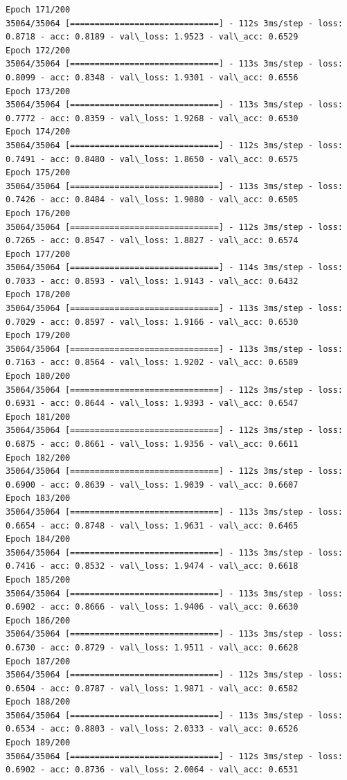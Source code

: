 \documentclass[11pt]{article}
\begin{document}
\begin{Verbatim}[commandchars=\\\{\}]
Epoch 171/200
35064/35064 [==============================] - 112s 3ms/step - loss: 0.8718 - acc: 0.8189 - val\_loss: 1.9523 - val\_acc: 0.6529
Epoch 172/200
35064/35064 [==============================] - 113s 3ms/step - loss: 0.8099 - acc: 0.8348 - val\_loss: 1.9301 - val\_acc: 0.6556
Epoch 173/200
35064/35064 [==============================] - 113s 3ms/step - loss: 0.7772 - acc: 0.8359 - val\_loss: 1.9268 - val\_acc: 0.6530
Epoch 174/200
35064/35064 [==============================] - 112s 3ms/step - loss: 0.7491 - acc: 0.8480 - val\_loss: 1.8650 - val\_acc: 0.6575
Epoch 175/200
35064/35064 [==============================] - 113s 3ms/step - loss: 0.7426 - acc: 0.8484 - val\_loss: 1.9080 - val\_acc: 0.6505
Epoch 176/200
35064/35064 [==============================] - 112s 3ms/step - loss: 0.7265 - acc: 0.8547 - val\_loss: 1.8827 - val\_acc: 0.6574
Epoch 177/200
35064/35064 [==============================] - 114s 3ms/step - loss: 0.7033 - acc: 0.8593 - val\_loss: 1.9143 - val\_acc: 0.6432
Epoch 178/200
35064/35064 [==============================] - 113s 3ms/step - loss: 0.7029 - acc: 0.8597 - val\_loss: 1.9166 - val\_acc: 0.6530
Epoch 179/200
35064/35064 [==============================] - 113s 3ms/step - loss: 0.7163 - acc: 0.8564 - val\_loss: 1.9202 - val\_acc: 0.6589
Epoch 180/200
35064/35064 [==============================] - 112s 3ms/step - loss: 0.6931 - acc: 0.8644 - val\_loss: 1.9393 - val\_acc: 0.6547
Epoch 181/200
35064/35064 [==============================] - 112s 3ms/step - loss: 0.6875 - acc: 0.8661 - val\_loss: 1.9356 - val\_acc: 0.6611
Epoch 182/200
35064/35064 [==============================] - 112s 3ms/step - loss: 0.6900 - acc: 0.8639 - val\_loss: 1.9039 - val\_acc: 0.6607
Epoch 183/200
35064/35064 [==============================] - 113s 3ms/step - loss: 0.6654 - acc: 0.8748 - val\_loss: 1.9631 - val\_acc: 0.6465
Epoch 184/200
35064/35064 [==============================] - 113s 3ms/step - loss: 0.7416 - acc: 0.8532 - val\_loss: 1.9474 - val\_acc: 0.6618
Epoch 185/200
35064/35064 [==============================] - 113s 3ms/step - loss: 0.6902 - acc: 0.8666 - val\_loss: 1.9406 - val\_acc: 0.6630
Epoch 186/200
35064/35064 [==============================] - 113s 3ms/step - loss: 0.6730 - acc: 0.8729 - val\_loss: 1.9511 - val\_acc: 0.6628
Epoch 187/200
35064/35064 [==============================] - 112s 3ms/step - loss: 0.6504 - acc: 0.8787 - val\_loss: 1.9871 - val\_acc: 0.6582
Epoch 188/200
35064/35064 [==============================] - 113s 3ms/step - loss: 0.6534 - acc: 0.8803 - val\_loss: 2.0333 - val\_acc: 0.6526
Epoch 189/200
35064/35064 [==============================] - 112s 3ms/step - loss: 0.6902 - acc: 0.8736 - val\_loss: 2.0064 - val\_acc: 0.6531

\end{Verbatim}
\end{document}
